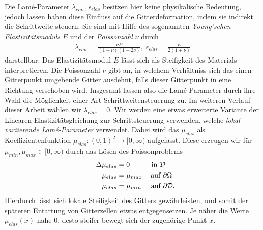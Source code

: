 Die Lamé-Parameter $\lambda_{elas}, \epsilon_{elas}$ besitzen hier keine physikalische Bedeutung, jedoch lassen haben diese Einfluss auf die Gitterdeformation, indem sie indirekt die Schrittweite steuern. Sie sind mit Hilfe des sogenannten \textit{Young'schen Elastizitätsmoduls} $E$ und der \textit{Poissonzahl} $\nu$ durch
\begin{align*}
	\lambda_{elas} = \frac{\nu E}{(1+\nu)(1-2\nu)}, \; 
	\epsilon_{elas} = \frac{E}{2(1+\nu)}
\end{align*}
darstellbar. Das Elastizitätsmodul $E$ lässt sich als Steifigkeit des Materials interpretieren. Die Poissonzahl $\nu$ gibt an, in welchem Verhältniss sich das einen Gitterpunkt umgebende Gitter ausdehnt, falls dieser Gitterpunkt in eine Richtung verschoben wird. Insgesamt lassen also die Lamé-Parameter durch ihre Wahl die Möglichkeit einer Art Schrittweitensteuerung zu. Im weiteren Verlauf dieser Arbeit wählen wir $\lambda_{elas} = 0$.
Wir werden eine etwas erweiterte Variante der Linearen Elastizitätsgleichung zur Schrittsteuerung verwenden, welche \textit{lokal variierende Lamé-Parameter} verwendet. Dabei wird das $\mu_{elas}$ als Koeffizientenfunktion $\mu_{elas}: (0,1)^2 \rightarrow [0,\infty)$ aufgefasst. Diese erzeugen wir für $\mu_{min}, \mu_{max} \in [0,\infty)$ durch das Lösen des Poissonproblems 
\begin{equation}
\label{loclame}
	\begin{aligned}
	-\Delta \mu_{elas} &=  0  \hspace{0.95cm}\text{ in } \mathcal{D} \\ 
	\mu_{elas} &= \mu_{max}   \hspace{0.3cm}\text{ auf } \partial\Omega \\
	\mu_{elas} &= \mu_{min}   \hspace{0.35cm}\text{ auf } \partial\mathcal{D}.
	\end{aligned}
\end{equation}
Hierdurch lässt sich lokale Steifigkeit des Gitters gewährleisten, und somit der späteren Entartung von Gitterzellen etwas entgegensetzen. Je näher die Werte $\mu_{elas}(x)$ nahe $0$, desto steifer bewegt sich der zugehörige Punkt $x$.

